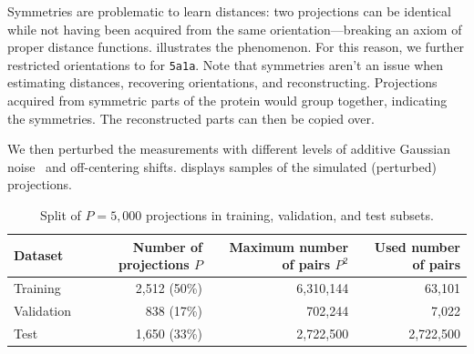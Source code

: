 Symmetries are problematic to learn distances: two projections can be identical while not having been acquired from the same orientation---breaking an axiom of proper distance functions.
 illustrates the phenomenon.
For this reason, we further restricted orientations to  for \texttt{5a1a}.
Note that symmetries aren't an issue when estimating distances, recovering orientations, and reconstructing.
Projections acquired from symmetric parts of the protein would group together, indicating the symmetries.
The reconstructed parts can then be copied over.

We then perturbed the measurements with different levels of additive Gaussian noise~\cite{sorzano2004normalizing,shigematsu2013noise} and off-centering shifts. %
 displays samples of the simulated (perturbed) projections.

\begin{table}[ht!]
    \centering
    \begin{tabular}{lrrr}
        \toprule
        Dataset & Number of projections $P$ & Maximum number of pairs $P^2$ & Used number of pairs \\
        \midrule
        Training & 2,512 (50\%) & 6,310,144 & 63,101 \\ %
        Validation & 838 (17\%) & 702,244 & 7,022 \\ %
        Test & 1,650 (33\%) & 2,722,500 & 2,722,500 \\ %
        \bottomrule
    \end{tabular}
    \caption{%
        Split of $P=5,000$ projections in training, validation, and test subsets.
    }\label{tab:dataset}
\end{table}

